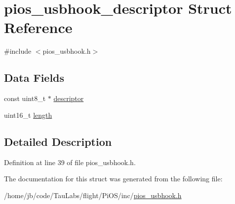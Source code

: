 \hypertarget{structpios__usbhook__descriptor}{\section{pios\-\_\-usbhook\-\_\-descriptor \-Struct \-Reference}
\label{structpios__usbhook__descriptor}
}


{\ttfamily \#include $<$pios\-\_\-usbhook.\-h$>$}

\subsection*{\-Data \-Fields}
\begin{DoxyCompactItemize}
\item 
const uint8\-\_\-t $\ast$ \hyperlink{group___p_i_o_s___u_s_b_h_o_o_k_ga56ff6e20a77e4421c8c47442ca13d75b}{descriptor}
\item 
uint16\-\_\-t \hyperlink{group___p_i_o_s___u_s_b_h_o_o_k_ga9cc49b35b49236ac74e747d179a3650f}{length}
\end{DoxyCompactItemize}


\subsection{\-Detailed \-Description}


\-Definition at line 39 of file pios\-\_\-usbhook.\-h.



\-The documentation for this struct was generated from the following file\-:\begin{DoxyCompactItemize}
\item 
/home/jb/code/\-Tau\-Labs/flight/\-Pi\-O\-S/inc/\hyperlink{pios__usbhook_8h}{pios\-\_\-usbhook.\-h}\end{DoxyCompactItemize}
